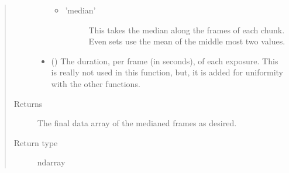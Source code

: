 \documentclass[letterpaper,10pt,english]{sphinxmanual}
\begin{document}
\begin{fulllineitems}
\begin{quote}
\begin{description}
\begin{itemize}
\begin{itemize}
\begin{description}
\end{description}

\item {} \begin{description}
\item[{’median’}] \leavevmode
This takes the median along the frames of
each chunk. Even sets use the mean of the
middle most two values.

\end{description}

\end{itemize}


\item {} 
 () \textendash{} The duration, per frame (in seconds), of each exposure.
This is really not used in this function, but, it is added
for uniformity with the other functions.

\end{itemize}

\item[{Returns}] \leavevmode
{} \textendash{} The final data array of the median\sphinxhyphen{}ed frames as desired.

\item[{Return type}] \leavevmode
ndarray

\end{description}\end{quote}

\end{fulllineitems}

\end{document}
